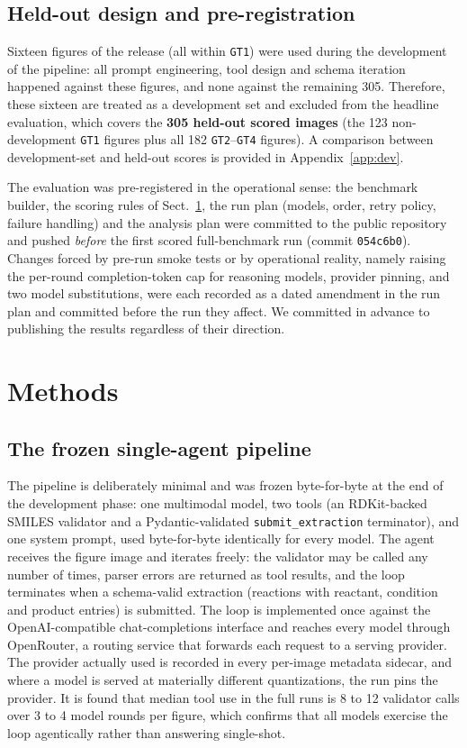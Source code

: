 \documentclass{article}
\begin{document}
\subsection{Held-out design and pre-registration}
\label{sec:preregistration}

Sixteen figures of the release (all within \texttt{GT1}) were used
during the development of the pipeline: all prompt engineering, tool
design and schema iteration happened against these figures, and none
against the remaining 305. Therefore, these sixteen are treated as a
development set and excluded from the headline evaluation, which
covers the \textbf{305 held-out scored images} (the 123
non-development \texttt{GT1} figures plus all 182
\texttt{GT2}--\texttt{GT4} figures). A comparison between
development-set and held-out scores is provided in
Appendix~\ref{app:dev}.

The evaluation was pre-registered in the operational sense: the
benchmark builder, the scoring rules of Sect.~\ref{sec:methods}, the
run plan (models, order, retry policy, failure handling) and the
analysis plan were committed to the public repository and pushed
\emph{before} the first scored full-benchmark run (commit
\texttt{054c6b0}). Changes forced by pre-run smoke tests or by
operational reality, namely raising the per-round completion-token cap
for reasoning models, provider pinning, and two model substitutions,
were each recorded as a dated amendment in the run plan and committed
before the run they affect. We committed in advance to publishing the
results regardless of their direction.

\section{Methods}
\label{sec:methods}

\subsection{The frozen single-agent pipeline}
The pipeline is deliberately minimal and was frozen byte-for-byte at
the end of the development phase: one
multimodal model, two tools (an RDKit-backed\citep{RDKit} SMILES
validator and a Pydantic-validated \texttt{submit\_extraction}
terminator), and one system prompt, used byte-for-byte identically for
every model. The agent receives the figure image and iterates freely:
the validator may be called any number of times, parser errors are
returned as tool results, and the loop terminates when a schema-valid
extraction (reactions with reactant, condition and product entries) is
submitted. The loop is implemented once against the OpenAI-compatible
chat-completions interface and reaches every model through OpenRouter,
a routing service that forwards each request to a serving provider.
The provider actually used is recorded in every per-image metadata
sidecar, and where a model is served at materially different
quantizations, the run pins the provider. It is found that median tool
use in the full runs is 8 to 12 validator calls over 3 to 4 model
rounds per figure, which confirms that all models exercise the loop
agentically rather than answering single-shot.
\end{document}
